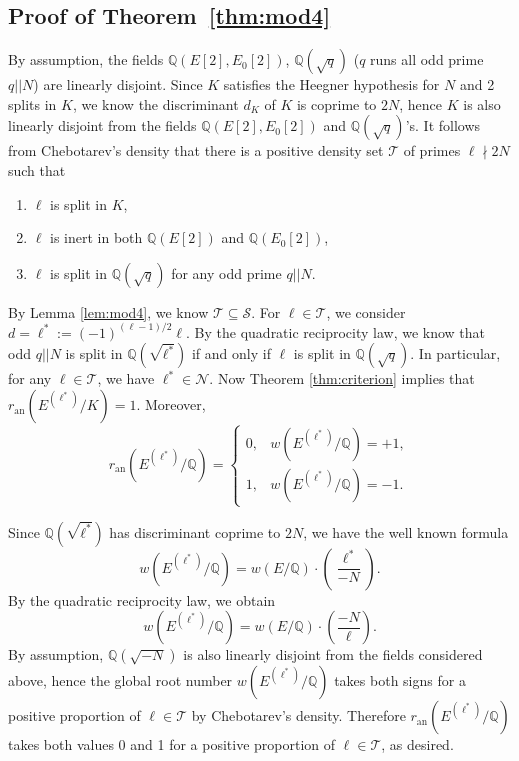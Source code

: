 \documentclass[11pt]{amsart}
\newcommand{\legendre}[2]{%
\genfrac{(}{)}{}{}{#1}{#2}}
\theoremstyle{definition}
\begin{document}
\subsection{Proof of Theorem~\ref{thm:mod4}}
 By assumption, the fields $\mathbb{Q}(E[2], E_0[2])$, $\mathbb{Q}(\sqrt{q})$ ($q$ runs all odd prime $q||N$) are linearly disjoint. Since $K$ satisfies the Heegner hypothesis for $N$ and 2 splits in $K$, we know the discriminant $d_K$ of $K$ is coprime to $2N$, hence $K$ is also linearly disjoint from the fields $\mathbb{Q}(E[2],E_0[2])$ and $\mathbb{Q}(\sqrt{q})$'s. It follows from Chebotarev's density that there is a positive density set $\mathcal{T}$ of primes $\ell\nmid 2N$ such that
  \begin{enumerate}
  \item $\ell$ is split in $K$,
  \item $\ell$ is inert in both $\mathbb{Q}(E[2])$ and $\mathbb{Q}(E_0[2])$,
  \item $\ell$ is split in $\mathbb{Q}(\sqrt{q})$ for any odd prime $q||N$.
  \end{enumerate}

    By Lemma \ref{lem:mod4}, we know $\mathcal{T}\subseteq \mathcal{S}$. For $\ell\in \mathcal{T}$, we consider $d=\ell^*:=(-1)^{(\ell-1)/2}\ell$. By the quadratic reciprocity law, we know that odd $q||N$ is split in $\mathbb{Q}(\sqrt{\ell^*})$ if and only if $\ell$ is split in $\mathbb{Q}(\sqrt{q})$. In particular, for any $\ell\in \mathcal{T}$, we have $\ell^*\in \mathcal{N}$. Now Theorem \ref{thm:criterion} implies that $r_\mathrm{an}(E^{(\ell^*)}/K)=1$. Moreover, $$r_\mathrm{an}(E^{(\ell^*)}/\mathbb{Q})=
    \begin{cases}
      0, & w(E^{(\ell^*)}/\mathbb{Q})=+1,\\
      1, & w(E^{(\ell^*)}/\mathbb{Q})=-1.
    \end{cases}
    $$

    Since $\mathbb{Q}(\sqrt{\ell^*})$ has discriminant coprime to $2N$, we have the well known formula $$w(E^{(\ell^*)}/\mathbb{Q})=w(E/\mathbb{Q})\cdot \legendre{\ell^*}{-N}.$$ By the quadratic reciprocity law, we obtain $$w(E^{(\ell^*)}/\mathbb{Q})=w(E/\mathbb{Q})\cdot \legendre{-N}{\ell}.$$ By assumption, $\mathbb{Q}(\sqrt{-N})$ is also linearly disjoint from the fields considered above, hence the global root number $w(E^{(\ell^*)}/\mathbb{Q})$ takes both signs for a positive proportion of $\ell\in \mathcal{T}$ by Chebotarev's density. Therefore $r_\mathrm{an}(E^{(\ell^*)}/\mathbb{Q})$ takes both values 0 and 1 for a positive proportion of $\ell\in \mathcal{T}$, as desired.




\end{document}
